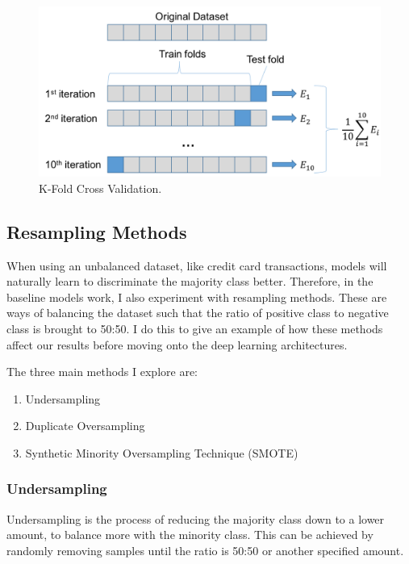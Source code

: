 \documentclass[12pt,a4paper,twoside]{report}
\begin{document}
\begin{figure}[H]

\centering
\includegraphics[scale=0.8]{cross-val}
\caption{K-Fold Cross Validation.}
\label{fig:k-fold-cross-val}
\end{figure}

\subsection{Resampling Methods}

When using an unbalanced dataset, like credit card transactions, models will naturally learn to discriminate the majority class better. Therefore, in the baseline models work, I also experiment with resampling methods.
These are ways of balancing the dataset such that the ratio of positive class to negative class is brought to 50:50. I do this to give an example of how these methods affect our results before moving onto the deep learning architectures. 

The three main methods I explore are:

\begin{enumerate}
  \item Undersampling 
  \item Duplicate Oversampling
  \item Synthetic Minority Oversampling Technique (SMOTE)
\end{enumerate}

\subsubsection{Undersampling}
Undersampling is the process of reducing the majority class down to a lower amount, to balance more with the minority class. This can be achieved by randomly removing samples until the ratio is 50:50 or another specified amount. 
\end{document}
